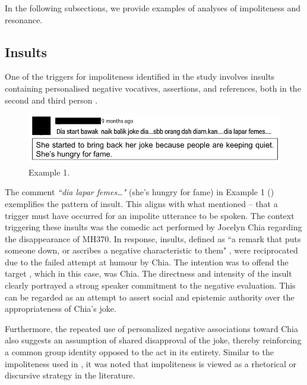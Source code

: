 \documentclass[english]{textolivre}
\begin{document}
In the following subsections, we provide examples of analyses of impoliteness and resonance.

\subsection{Insults}
One of the triggers for impoliteness identified in the study involves insults containing personalised negative vocatives, assertions, and references, both in the second and third person \cite{culpeper2011}.

\begin{figure}[h!]
    \centering
    \begin{minipage}{0.70\linewidth}
    \includegraphics[width=\linewidth]{imagens/figura3-junto.png}
    \caption{Example 1.}
    \label{example-1}
    \end{minipage}
\end{figure}

The comment \textit{``dia lapar femes…"} (she’s hungry for fame) in Example 1 () exemplifies the pattern of insult. This aligns with what \textcite{bousfield2007} mentioned -- that a trigger must have occurred for an impolite utterance to be spoken. The context triggering these insults was the comedic act performed by Jocelyn Chia regarding the disappearance of MH370. In response, insults, defined as ``a remark that puts someone down, or ascribes a negative characteristic to them" \cite[p. 20]{hay2002}, were reciprocated due to the failed attempt at humour by Chia. The intention was to offend the target \cite{dynel2019, hay2002}, which in this case, was Chia. The directness and intensity of the insult clearly portrayed a strong speaker commitment to the negative evaluation. This can be regarded as an attempt to assert social and epistemic authority over the appropriateness of Chia’s joke. 

Furthermore, the repeated use of personalized negative associations toward Chia also suggests an assumption of shared disapproval of the joke, thereby reinforcing a common group identity opposed to the act in its entirety. Similar to the impoliteness used in \textcite{han2021}, it was noted that impoliteness is viewed as a rhetorical or discursive strategy in the literature.
\end{document}
